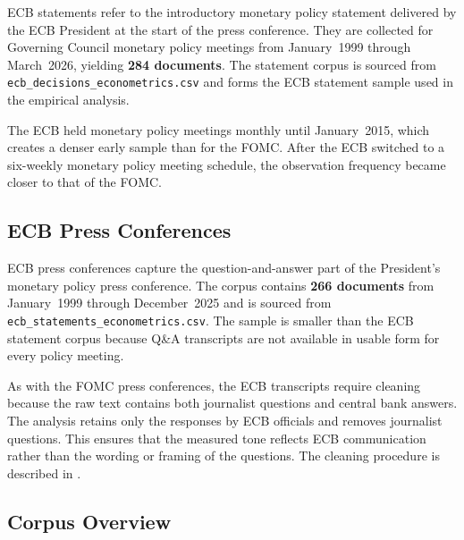 ECB statements refer to the introductory monetary policy statement
delivered by the ECB President at the start of the press conference.
They are collected for Governing Council monetary policy meetings from
January~1999 through March~2026, yielding \textbf{284 documents}. The
statement corpus is sourced from \texttt{ecb\_decisions\_econometrics.csv}
and forms the ECB statement sample used in the empirical analysis.

The ECB held monetary policy meetings monthly until January~2015, which
creates a denser early sample than for the FOMC. After the ECB switched
to a six-weekly monetary policy meeting schedule, the observation
frequency became closer to that of the FOMC.

\subsection{ECB Press Conferences}
\label{sec:data_ecb_pc}

ECB press conferences capture the question-and-answer part of the
President's monetary policy press conference. The corpus contains
\textbf{266 documents} from January~1999 through December~2025 and is
sourced from \texttt{ecb\_statements\_econometrics.csv}. The sample is
smaller than the ECB statement corpus because Q\&A transcripts are not
available in usable form for every policy meeting.

As with the FOMC press conferences, the ECB transcripts require cleaning
because the raw text contains both journalist questions and central bank
answers. The analysis retains only the responses by ECB officials and
removes journalist questions. This ensures that the measured tone
reflects ECB communication rather than the wording or framing of the
questions. The cleaning procedure is described in
.

\subsection{Corpus Overview}

